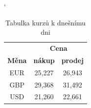 \documentclass[11pt]{article}
\begin{document}
\begin{table}[h] 
    \catcode`
    \centering
    \begin{tabular}{|c|c|c|}
        \hline
        & \multicolumn{2}{c|}{\textbf{Cena}} \\ \cline{2-3}
        \textbf{Měna} & \textbf{nákup} & \textbf{prodej} \\ \hline
        EUR & 25,227 & 26,943 \\
        GBP & 29,368 & 31,492 \\
        USD & 21,260 & 22,661 \\ \hline
    \end{tabular}
    \caption{Tabulka kurzů k dnešnímu dni}
    \label{tab:1}
\end{table}

\bigskip
\end{document}
